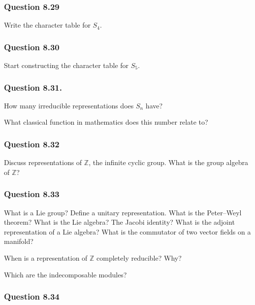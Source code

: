 \hypertarget{question-8.29}{%
\subsubsection{Question 8.29}\label{question-8.29}}

Write the character table for \(S_4\).

\hypertarget{question-8.30}{%
\subsubsection{Question 8.30}\label{question-8.30}}

Start constructing the character table for \(S_5\).

\hypertarget{question-8.31.}{%
\subsubsection{Question 8.31.}\label{question-8.31.}}

How many irreducible representations does \(S_n\) have?

What classical function in mathematics does this number relate to?

\hypertarget{question-8.32}{%
\subsubsection{Question 8.32}\label{question-8.32}}

Discuss representations of \({\mathbb{Z}}\), the infinite cyclic group.
What is the group algebra of \({\mathbb{Z}}\)?

\hypertarget{question-8.33}{%
\subsubsection{Question 8.33}\label{question-8.33}}

What is a Lie group? Define a unitary representation. What is the
Peter--Weyl theorem? What is the Lie algebra? The Jacobi identity? What
is the adjoint representation of a Lie algebra? What is the commutator
of two vector fields on a manifold?

When is a representation of \({\mathbb{Z}}\) completely reducible? Why?

Which are the indecomposable modules?

\hypertarget{question-8.34}{%
\subsubsection{Question 8.34}\label{question-8.34}}

